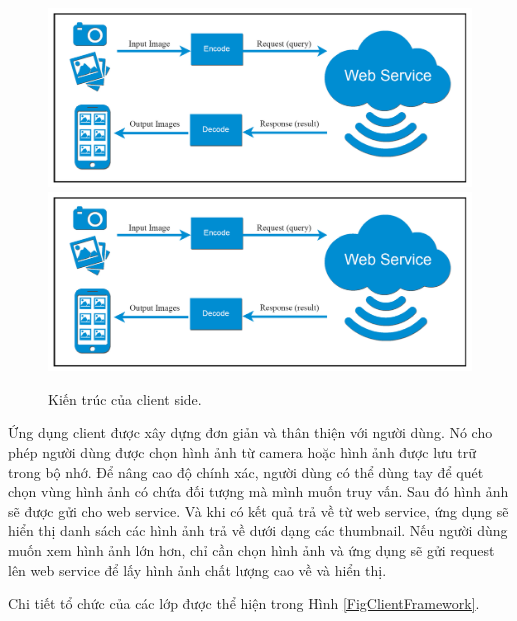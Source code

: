 \begin{figure}[!htbp]
  \begin{center}
    \leavevmode
    \ifpdf
      \includegraphics[scale=0.25]{android_client}
    \else
      \includegraphics[scale=0.25]{android_client}
    \fi
    \caption[Kiến trúc của client side]{Kiến trúc của client side.}
    \label{FigAndroidClient}
  \end{center}
\end{figure}


Ứng dụng client được xây dựng đơn giản và thân thiện với người dùng. Nó cho phép người dùng được chọn hình ảnh từ camera hoặc hình ảnh được lưu trữ trong bộ nhớ. Để nâng cao độ chính xác, người dùng có thể dùng tay để quét chọn vùng hình ảnh có chứa đối tượng mà mình muốn truy vấn. Sau đó hình ảnh sẽ được gửi cho web service. Và khi có kết quả trả về từ web service, ứng dụng sẽ hiển thị danh sách các hình ảnh trả về dưới dạng các thumbnail. Nếu người dùng muốn xem hình ảnh lớn hơn, chỉ cần chọn hình ảnh và ứng dụng sẽ gửi request lên web service để lấy hình ảnh chất lượng cao về và hiển thị.

Chi tiết tổ chức của các lớp được thể hiện trong Hình \ref{FigClientFramework}.

